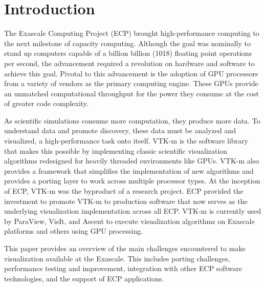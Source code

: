 \section{Introduction}

The Exascale Computing Project (ECP) brought high-performance computing to the next milestone of capacity computing.
Although the goal was nominally to stand up computers capable of a billion billion (1018) floating point operations per second, the advancement required a revolution on hardware and software to achieve this goal.
Pivotal to this advancement is the adoption of GPU processors from a variety of vendors as the primary computing engine.
These GPUs provide an unmatched computational throughput for the power they consume at the cost of greater code complexity.

As scientific simulations consume more computation, they produce more data.
To understand data and promote discovery, these data must be analyzed and visualized, a high-performance task onto itself.
VTK-m is the software library that makes this possible by implementing classic scientific visualization algorithms redesigned for heavily threaded environments like GPUs.
VTK-m also provides a framework that simplifies the implementation of new algorithms and provides a porting layer to work across multiple processor types.
At the inception of ECP, VTK-m was the byproduct of a research project.
ECP provided the investment to promote VTK-m to production software that now serves as the underlying visualization implementation across all ECP.
VTK-m is currently used by ParaView, VisIt, and Ascent to execute visualization algorithms on Exascale platforms and others using GPU processing.

This paper provides an overview of the main challenges encountered to make visualization available at the Exascale.
This includes porting challenges, performance testing and improvement, integration with other ECP software technologies, and the support of ECP applications.
